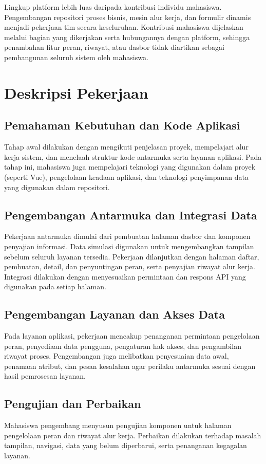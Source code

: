 Lingkup platform lebih luas daripada kontribusi individu mahasiswa. Pengembangan repositori proses bisnis, mesin alur kerja, dan formulir dinamis menjadi pekerjaan tim secara keseluruhan. Kontribusi mahasiswa dijelaskan melalui bagian yang dikerjakan serta hubungannya dengan platform, sehingga penambahan fitur peran, riwayat, atau dasbor tidak diartikan sebagai pembangunan seluruh sistem oleh mahasiswa.

\section{Deskripsi Pekerjaan}
\subsection{Pemahaman Kebutuhan dan Kode Aplikasi}
Tahap awal dilakukan dengan mengikuti penjelasan proyek, mempelajari alur kerja sistem, dan menelaah struktur kode antarmuka serta layanan aplikasi. Pada tahap ini, mahasiswa juga mempelajari teknologi yang digunakan dalam proyek (seperti Vue), pengelolaan keadaan aplikasi, dan teknologi penyimpanan data yang digunakan dalam repositori.

\subsection{Pengembangan Antarmuka dan Integrasi Data}
Pekerjaan antarmuka dimulai dari pembuatan halaman dasbor dan komponen penyajian informasi. Data simulasi digunakan untuk mengembangkan tampilan sebelum seluruh layanan tersedia. Pekerjaan dilanjutkan dengan halaman daftar, pembuatan, detail, dan penyuntingan peran, serta penyajian riwayat alur kerja. Integrasi dilakukan dengan menyesuaikan permintaan dan respons API\label{istilah:api} yang digunakan pada setiap halaman.

\subsection{Pengembangan Layanan dan Akses Data}
Pada layanan aplikasi, pekerjaan mencakup penanganan permintaan pengelolaan peran, penyediaan data pengguna, pengaturan hak akses, dan pengambilan riwayat proses. Pengembangan juga melibatkan penyesuaian data awal, penamaan atribut, dan pesan kesalahan agar perilaku antarmuka sesuai dengan hasil pemrosesan layanan.

\subsection{Pengujian dan Perbaikan}
Mahasiswa pengembang menyusun pengujian komponen untuk halaman pengelolaan peran dan riwayat alur kerja. Perbaikan dilakukan terhadap masalah tampilan, navigasi, data yang belum diperbarui, serta penanganan kegagalan layanan.

